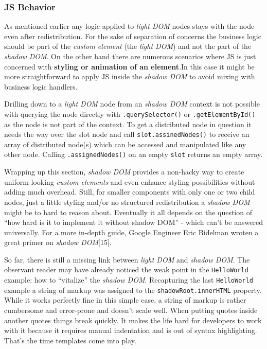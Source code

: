 \documentclass[]{assets/latex/ieee}
\begin{document}
\subsubsection{JS Behavior}\label{js-behavior}

As mentioned earlier any logic applied to \emph{light DOM} nodes stays
with the node even after redistribution. For the sake of separation of
concerns the business logic should be part of the \emph{custom element}
(the \emph{light DOM}) and not the part of the \emph{shadow DOM}. On the
other hand there are numerous scenarios where JS is just concerned with
\textbf{styling or animation of an element}.In this case it might be
more straightforward to apply JS inside the \emph{shadow DOM} to avoid
mixing with business logic handlers.

Drilling down to a \emph{light DOM} node from an \emph{shadow DOM}
context is not possible with querying the node directly with
\texttt{.querySelector()} or \texttt{.getElementById()} as the node is
not part of the context. To get a distributed node in question it needs
the way over the slot node and call \texttt{slot.assinedNodes()} to
receive an array of distributed node(s) which can be accessed and
manipulated like any other node. Calling \texttt{.assignedNodes()} on an
empty \texttt{slot} returns an empty array.

Wrapping up this section, \emph{shadow DOM} provides a non-hacky way to
create uniform looking \emph{custom elements} and even enhance styling
possibilities without adding much overhead. Still, for smaller
components with only one or two child nodes, just a little styling
and/or no structured redistribution a \emph{shadow DOM} might be to hard
to reason about. Eventually it all depends on the question of ``how hard
is it to implement it without shadow DOM'' - which can't be answered
universally. For a more in-depth guide, Google Engineer Eric Bidelman
wroten a great primer on \emph{shadow DOM}{[}15{]}.

So far, there is still a missing link between \emph{light DOM} and
\emph{shadow DOM}. The observant reader may have already noticed the
weak point in the \texttt{HelloWorld} example: how to ``vitalize'' the
\emph{shadow DOM}. Recapturing the last \texttt{HelloWorld} example a
string of markup was assigned to the \texttt{shadowRoot.innerHTML}
property. While it works perfectly fine in this simple case, a string of
markup is rather cumbersome and error-prone and doesn't scale well. When
putting quotes inside another quotes things break quickly. It makes the
life hard for developers to work with it because it requires manual
indentation and is out of syntax highlighting. That's the time templates
come into play.
\end{document}
